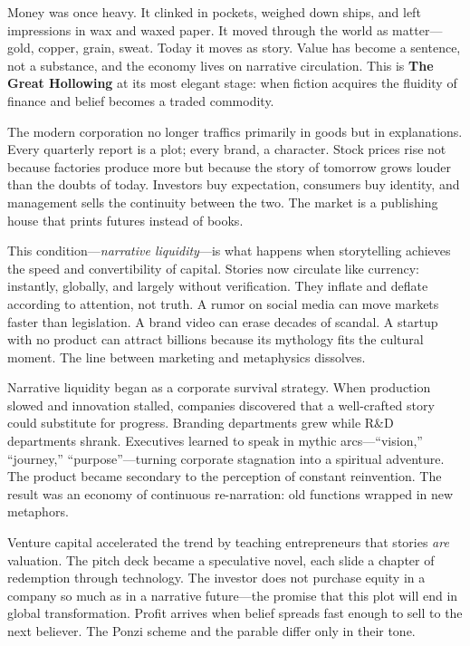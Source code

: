 \documentclass[11pt,twoside]{book}
\begin{document}
Money was once heavy.  
It clinked in pockets, weighed down ships, and left impressions in wax and waxed paper.  It moved through the world as matter—gold, copper, grain, sweat.  Today it moves as story.  Value has become a sentence, not a substance, and the economy lives on narrative circulation.  This is \textbf{The Great Hollowing} at its most elegant stage: when fiction acquires the fluidity of finance and belief becomes a traded commodity.

The modern corporation no longer traffics primarily in goods but in explanations.  Every quarterly report is a plot; every brand, a character.  Stock prices rise not because factories produce more but because the story of tomorrow grows louder than the doubts of today.  Investors buy expectation, consumers buy identity, and management sells the continuity between the two.  The market is a publishing house that prints futures instead of books.

This condition—\emph{narrative liquidity}—is what happens when storytelling achieves the speed and convertibility of capital.  Stories now circulate like currency: instantly, globally, and largely without verification.  They inflate and deflate according to attention, not truth.  A rumor on social media can move markets faster than legislation.  A brand video can erase decades of scandal.  A startup with no product can attract billions because its mythology fits the cultural moment.  The line between marketing and metaphysics dissolves.

Narrative liquidity began as a corporate survival strategy.  When production slowed and innovation stalled, companies discovered that a well-crafted story could substitute for progress.  Branding departments grew while R\&D departments shrank.  Executives learned to speak in mythic arcs—“vision,” “journey,” “purpose”—turning corporate stagnation into a spiritual adventure.  The product became secondary to the perception of constant reinvention.  The result was an economy of continuous re-narration: old functions wrapped in new metaphors.

Venture capital accelerated the trend by teaching entrepreneurs that stories \emph{are} valuation.  The pitch deck became a speculative novel, each slide a chapter of redemption through technology.  The investor does not purchase equity in a company so much as in a narrative future—the promise that this plot will end in global transformation.  Profit arrives when belief spreads fast enough to sell to the next believer.  The Ponzi scheme and the parable differ only in their tone.
\end{document}

